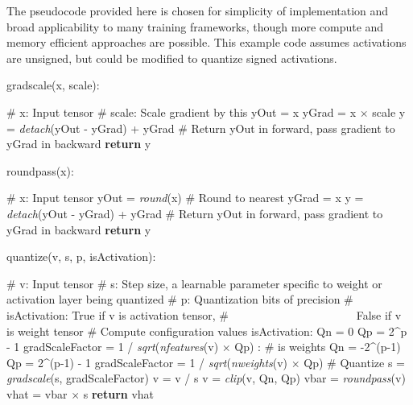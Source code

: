 \documentclass{article}
\begin{document}
The pseudocode provided here is chosen for simplicity of implementation and broad applicability to many training frameworks, though more compute and memory efficient approaches are possible.
This example code assumes activations are unsigned, but could be modified to quantize signed activations.




\setcounter{algorithm}{0}

\begin{algorithm}
   \caption{gradscale(x, scale):}
   \label{alg:gradscale}
\begin{algorithmic}
   \STATE \# x: Input tensor   
   \STATE \# scale: Scale gradient by this
   \STATE yOut = x
   \STATE yGrad = x $\times$ scale
   \STATE y = \textit{detach}(yOut - yGrad) + yGrad \# Return yOut in forward, pass gradient to yGrad in backward
   \STATE \textbf{return} y
\end{algorithmic}
\end{algorithm}

\begin{algorithm}
   \caption{roundpass(x):}
   \label{alg:roundpass}
\begin{algorithmic}
   \STATE \# x: Input tensor   
   \STATE yOut = \textit{round}(x) \# Round to nearest
   \STATE yGrad = x
   \STATE y = \textit{detach}(yOut - yGrad) + yGrad \# Return yOut in forward, pass gradient to yGrad in backward
   \STATE \textbf{return} y
\end{algorithmic}
\end{algorithm}


\begin{algorithm}
   \caption{quantize(v, s, p, isActivation):}
   \label{alg:quantize}
\begin{algorithmic}
   \STATE \# v: Input tensor
   \STATE \# s: Step size, a learnable parameter specific to weight or activation layer being quantized
   \STATE \# p: Quantization bits of precision
   \STATE \# isActivation: True if v is activation tensor, 
   \STATE \# \ \ \ \ \ \ \ \ \ \ \ \ \ \ \ \ \ \ \ \ \ \  False if v is weight tensor
   \STATE 
   \STATE \# Compute configuration values   
    isActivation:
   \STATE\hspace{\algorithmicindent} Qn = 0
   \STATE\hspace{\algorithmicindent} Qp = 2\^{}p - 1 \STATE\hspace{\algorithmicindent} gradScaleFactor = 1 / \textit{sqrt}(\textit{nfeatures}(v) $\times$ Qp)   
   : \# is weights
   \STATE\hspace{\algorithmicindent} Qn = -2\^{}(p-1)\STATE\hspace{\algorithmicindent} Qp = 2\^{}(p-1) - 1 \STATE\hspace{\algorithmicindent} gradScaleFactor = 1 / \textit{sqrt}(\textit{nweights}(v) $\times$ Qp)   
   \STATE
   \STATE \# Quantize
   \STATE s = \textit{gradscale}(s, gradScaleFactor)
   \STATE v = v / s
   \STATE v = \textit{clip}(v, Qn, Qp)
   \STATE vbar = \textit{roundpass}(v)
   \STATE vhat = vbar $\times$ s
   \STATE\textbf{return} vhat
\end{algorithmic}
\end{algorithm}
\end{document}
